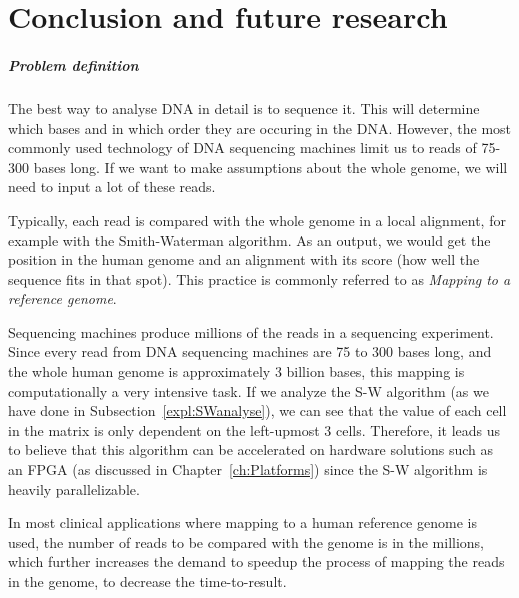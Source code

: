 
\chapter{Conclusion and future research}
\label{ch:Conclusions}

\paragraph{Problem definition} 

The best way to analyse DNA in detail is to sequence it. This will determine which bases and in which order they are occuring in the DNA. However, the most commonly used technology of DNA sequencing machines limit us to reads of 75-300 bases long. If we want to make assumptions about the whole genome, we will need to input a lot of these reads. 

Typically, each read is compared with the whole genome in a local alignment, for example with the Smith-Waterman algorithm. As an output, we would get the position in the human genome and an alignment with its score (how well the sequence fits in that spot). This practice is commonly referred to as \emph{Mapping to a reference genome}.

Sequencing machines produce millions of the reads in a sequencing experiment. Since every read from DNA sequencing machines are 75 to 300 bases long, and the whole human genome is approximately 3 billion bases, this mapping is computationally a very intensive task. If we analyze the S-W algorithm (as we have done in Subsection~\ref{expl:SWanalyse}), we can see that the value of each cell in the matrix is only dependent on the left-upmost 3 cells. Therefore, it leads us to believe that this algorithm can be accelerated on hardware solutions such as an FPGA (as discussed in Chapter~\ref{ch:Platforms}) since the S-W algorithm is heavily parallelizable.

In most clinical applications where mapping to a human reference genome is used, the number of reads to be compared with the genome is in the millions, which further increases the demand to speedup the process of mapping the reads in the genome, to decrease the time-to-result.

